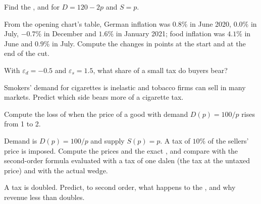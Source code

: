 \begin{exercise}[$\star$]\label{exo:b1:partial-equilibrium-welfare:cs-ps}
Find the ,  and  for $D = 120 - 2p$
and $S = p$.
\end{exercise}

\begin{exercise}[$\star$]\label{exo:b1:partial-equilibrium-welfare:read}
From the opening chart's table, German inflation was $0.8\%$ in June 2020,
$0.0\%$ in July, $-0.7\%$ in December and $1.6\%$ in January 2021; food inflation
was $4.1\%$ in June and $0.9\%$ in July. %
Compute the changes in points at the start and at the end of the cut.
\end{exercise}

\begin{exercise}[$\star$]\label{exo:b1:partial-equilibrium-welfare:share}
With $\varepsilon_d = -0.5$ and $\varepsilon_s = 1.5$, what share of a small tax do buyers bear?
\end{exercise}

\begin{exercise}[$\star$]\label{exo:b1:partial-equilibrium-welfare:cigarettes}
Smokers' demand for cigarettes is inelastic and tobacco firms can sell in
many markets. Predict which side bears more of a cigarette tax.
\end{exercise}

\begin{exercise}[$\star\star$]\label{exo:b1:partial-equilibrium-welfare:cs-integral}
Compute the loss of  when the price of a good with demand
$D(p) = 100/p$ rises from 1 to 2.
\end{exercise}

\begin{exercise}[$\star\star$]\label{exo:b1:partial-equilibrium-welfare:exact}
Demand is $D(p) = 100/p$ and supply $S(p) = p$. A tax of $10\%$ of the sellers'
price is imposed. Compute the prices and the exact , and
compare with the second-order formula evaluated with a tax of one dalen
(the tax at the untaxed price) and with the actual wedge.
\end{exercise}

\begin{exercise}[$\star\star$]\label{exo:b1:partial-equilibrium-welfare:double}
A tax is doubled. Predict, to second order, what happens to the , and why revenue less than doubles.
\end{exercise}

